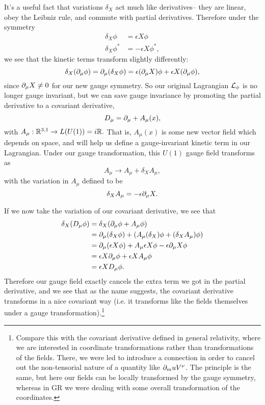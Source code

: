 It's a useful fact that variations $\delta_X$ act much like derivatives-- they are linear, obey the Leibniz rule, and commute with partial derivatives. Therefore under the symmetry
\begin{align*}
    \delta_X \phi &= \epsilon X \phi\\
    \delta_X \phi^* &= -\epsilon X \phi^*,
\end{align*}
we see that the kinetic terms transform slightly differently:
$$\delta_X(\partial_\mu \phi)= \partial_\mu(\delta_X \phi) =\epsilon (\partial_\mu X) \phi +\epsilon X (\partial_\mu \phi),$$
since $\partial_\mu X \neq 0$ for our new gauge symmetry.
So our original Lagrangian $\mathcal L_\phi$ is no longer gauge invariant, but we can save gauge invariance by promoting the partial derivative to a covariant derivative,
$$D_\mu=\partial_\mu + A_\mu(x),$$
with $A_\mu: \mathbb{R}^{3,1}\to L(U(1)) = i\mathbb{R}.$ That is, $A_\mu(x)$ is some new vector field which depends on space, and will help us define a gauge-invariant kinetic term in our Lagrangian. Under our gauge transformation, this $U(1)$ gauge field transforms as
$$A_\mu \to A_\mu + \delta_X A_\mu,$$
with the variation in $A_\mu$ defined to be
$$\delta_X A_\mu = -\epsilon \partial_\mu X.$$

If we now take the variation of our covariant derivative, we see that
\begin{align*}
    \delta_X(D_\mu\phi)&= \delta_X(\partial_\mu \phi + A_\mu \phi)\\
    &=\partial_\mu (\delta_X \phi)+(A_\mu (\delta_X) \phi + (\delta_X A_\mu) \phi)\\
    &= \partial_\mu (\epsilon X \phi)+ A_\mu \epsilon X \phi - \epsilon \partial_\mu X \phi\\
    &= \epsilon X \partial_\mu \phi +\epsilon X A_\mu \phi\\
    &= \epsilon X D_\mu \phi.
\end{align*}
Therefore our gauge field exactly cancels the extra term we got in the partial derivative, and we see that as the name suggests, the covariant derivative transforms in a nice covariant way (i.e. it transforms like the fields themselves under a gauge transformation).\footnote{Compare this with the covariant derivative defined in general relativity, where we are interested in coordinate transformations rather than transformations of the fields. There, we were led to introduce a connection in order to cancel out the non-tensorial nature of a quantity like $\partial_mu V^\nu$. The principle is the same, but here our fields can be locally transformed by the gauge symmetry, whereas in GR we were dealing with some overall transformation of the coordinates.}

